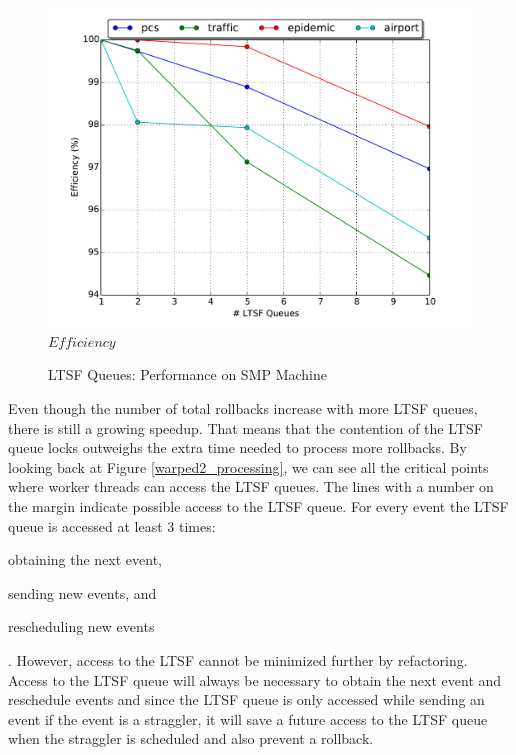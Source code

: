\documentclass[11pt]{book}
\begin{document}
\begin{figure}
\begin{minipage}{.5\textwidth}
\begin{center}
      \includegraphics[width=\textwidth,keepaspectratio,quiet]{figs/pending_event_set/ltsf_efficiency.pdf} \\
      $Efficiency$ \\
    \end{center}
  \end{minipage}
  \caption{LTSF Queues: Performance on SMP Machine}\label{ltsf_analysis}
\end{figure}

Even though the number of total rollbacks increase with more LTSF queues, there is still a
growing speedup.  That means that the contention of the LTSF queue locks outweighs the extra time
needed to process more rollbacks.  By looking back at Figure \ref{warped2_processing}, we can see all
the critical points where worker threads can access the LTSF queues.  The lines with a number on
the margin indicate possible access to the LTSF queue.  For every event the LTSF queue is accessed
at least 3 times: \begin{inparaenum}[(1)] \item obtaining the next event, \item sending new
events, and \item rescheduling new events \end{inparaenum}.  However, access to the LTSF cannot
be minimized further by refactoring.  Access to the LTSF queue will always be necessary to obtain
the next event and reschedule events and since the LTSF queue is only accessed while sending an
event if the event is a straggler, it will save a future access to the LTSF queue when the straggler
is scheduled and also prevent a rollback.
\end{document}
